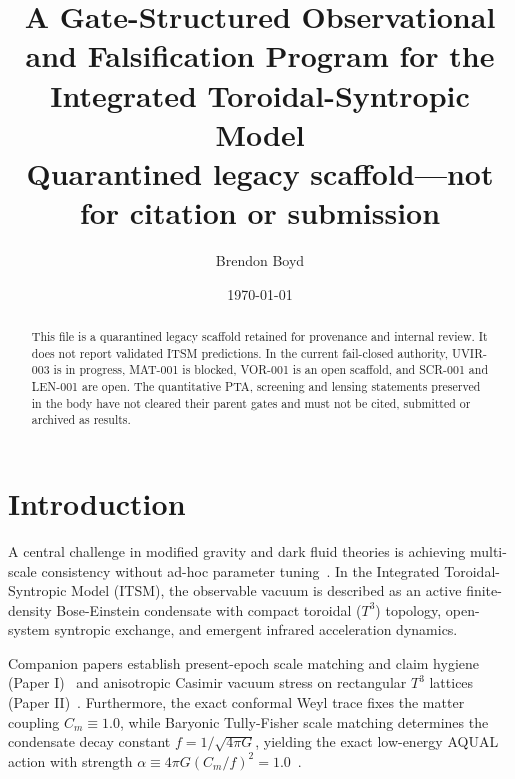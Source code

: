 \documentclass[aps,prd,twocolumn,superscriptaddress,nofootinbib,amsmath,amssymb]{revtex4-2}
\begin{document}
\title{A Gate-Structured Observational and Falsification Program for the Integrated Toroidal-Syntropic Model\\{\large Quarantined legacy scaffold---not for citation or submission}}

\author{Brendon Boyd}

\date{\today}

\begin{abstract}
This file is a quarantined legacy scaffold retained for provenance and internal review. It does not report validated ITSM predictions. In the current fail-closed authority, UVIR-003 is in progress, MAT-001 is blocked, VOR-001 is an open scaffold, and SCR-001 and LEN-001 are open. The quantitative PTA, screening and lensing statements preserved in the body have not cleared their parent gates and must not be cited, submitted or archived as results.
\end{abstract}

\maketitle

\begin{center}
\end{center}

\section{Introduction}
\label{sec:intro}

A central challenge in modified gravity and dark fluid theories is achieving multi-scale consistency without ad-hoc parameter tuning~\cite{milgrom1983,bekenstein2004,famaey_mcgaugh_2012}. In the Integrated Toroidal-Syntropic Model (ITSM), the observable vacuum is described as an active finite-density Bose-Einstein condensate with compact toroidal ($T^3$) topology, open-system syntropic exchange, and emergent infrared acceleration dynamics.

Companion papers establish present-epoch scale matching and claim hygiene (Paper I)~\cite{boyd_p1_2026} and anisotropic Casimir vacuum stress on rectangular $T^3$ lattices (Paper II)~\cite{boyd_p2_2026}. Furthermore, the exact conformal Weyl trace fixes the matter coupling $C_m \equiv 1.0$, while Baryonic Tully-Fisher scale matching determines the condensate decay constant $f = 1/\sqrt{4\pi G}$, yielding the exact low-energy AQUAL action with strength $\alpha \equiv 4\pi G (C_m/f)^2 = 1.0$~\cite{bekenstein_milgrom_1984}.
\end{document}
